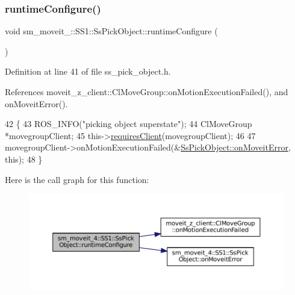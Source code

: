 \subsubsection{\texorpdfstring{runtime\+Configure()}{runtimeConfigure()}}
{\footnotesize\ttfamily void sm\+\_\+moveit\+\_\+::\+S\+S1\+::\+Ss\+Pick\+Object\+::runtime\+Configure (\begin{DoxyParamCaption}{ }\end{DoxyParamCaption})\hspace{0.3cm}{\ttfamily [inline]}}



Definition at line 41 of file ss\+\_\+pick\+\_\+object.\+h.



References moveit\+\_\+z\+\_\+client\+::\+Cl\+Move\+Group\+::on\+Motion\+Execution\+Failed(), and on\+Moveit\+Error().


\begin{DoxyCode}
42     \{
43         ROS\_INFO(\textcolor{stringliteral}{"picking object superstate"});
44         ClMoveGroup *movegroupClient;
45         this->\hyperlink{classsmacc_1_1ISmaccState_a7f95c9f0a6ea2d6f18d1aec0519de4ac}{requiresClient}(movegroupClient);
46 
47         movegroupClient->onMotionExecutionFailed(&\hyperlink{structsm__moveit__4_1_1SS1_1_1SsPickObject_a93785400a47ee6a1ad38d49b2a7a069b}{SsPickObject::onMoveitError}, \textcolor{keyword}{
      this});
48     \}
\end{DoxyCode}
Here is the call graph for this function\+:
\nopagebreak
\begin{figure}[H]
\begin{center}
\leavevmode
\includegraphics[width=350pt]{structsm__moveit__4_1_1SS1_1_1SsPickObject_a00ddf11db72eb417a0e4221426722c02_cgraph}
\end{center}
\end{figure}
\mbox{\label{structsm__moveit__4_1_1SS1_1_1SsPickObject_a14f0fa7ceafbbb3a1aca1475225ed5ce}} 
